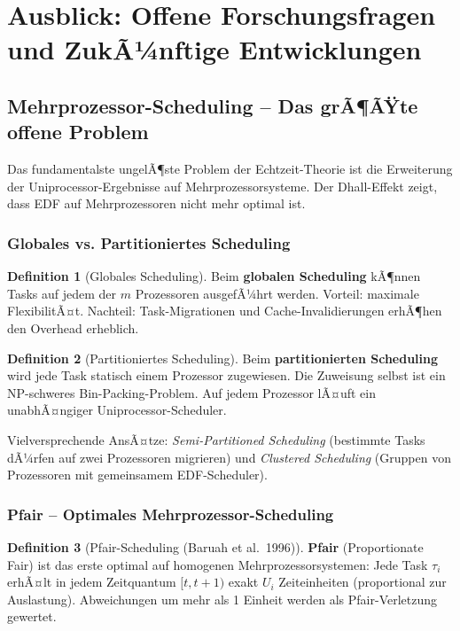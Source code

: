 ﻿\documentclass[a4paper,12pt]{report}
\theoremstyle{definition}
\newtheorem{definition}{Definition}[chapter]
\begin{document}
\section{Ausblick: Offene Forschungsfragen und ZukÃ¼nftige Entwicklungen}

\subsection{Mehrprozessor-Scheduling -- Das grÃ¶ÃŸte offene Problem}

Das fundamentalste ungelÃ¶ste Problem der Echtzeit-Theorie ist die Erweiterung
der Uniprocessor-Ergebnisse auf Mehrprozessorsysteme. Der Dhall-Effekt zeigt,
dass EDF auf Mehrprozessoren nicht mehr optimal ist.

\subsubsection{Globales vs. Partitioniertes Scheduling}

\begin{definition}[Globales Scheduling]
	Beim \textbf{globalen Scheduling} kÃ¶nnen Tasks auf jedem der $m$ Prozessoren
	ausgefÃ¼hrt werden. Vorteil: maximale FlexibilitÃ¤t. Nachteil: Task-Migrationen
	und Cache-Invalidierungen erhÃ¶hen den Overhead erheblich.
\end{definition}

\begin{definition}[Partitioniertes Scheduling]
	Beim \textbf{partitionierten Scheduling} wird jede Task statisch einem
	Prozessor zugewiesen. Die Zuweisung selbst ist ein NP-schweres Bin-Packing-Problem.
	Auf jedem Prozessor lÃ¤uft ein unabhÃ¤ngiger Uniprocessor-Scheduler.
\end{definition}

Vielversprechende AnsÃ¤tze: \emph{Semi-Partitioned Scheduling} (bestimmte Tasks
dÃ¼rfen auf zwei Prozessoren migrieren) und \emph{Clustered Scheduling} (Gruppen
von Prozessoren mit gemeinsamem EDF-Scheduler).

\subsubsection{Pfair -- Optimales Mehrprozessor-Scheduling}

\begin{definition}[Pfair-Scheduling (Baruah et al.\ 1996)]
	\textbf{Pfair} (Proportionate Fair) ist das erste optimal auf homogenen
	Mehrprozessorsystemen: Jede Task $\tau_i$ erhÃ¤lt in jedem Zeitquantum
	$[t, t+1)$ exakt $U_i$ Zeiteinheiten (proportional zur Auslastung).
	Abweichungen um mehr als 1 Einheit werden als Pfair-Verletzung gewertet.
\end{definition}
\end{document}
